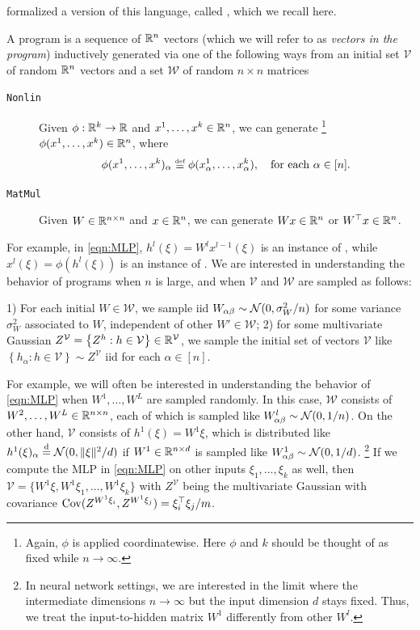 \documentclass[main.tex]{subfiles}
\begin{document}
\citet{yangTP2} formalized a version of this language, called \netsort{}, which we recall here.   
\begin{defn}\label{defn:netsort}
A \netsort{} program is a sequence of $\mathbb{R}^{n}$ vectors (which we will refer to as \emph{vectors in the program}) inductively generated via one of the following ways from an initial set $\mathcal{V}$ of random $\mathbb{R}^{n}$ vectors and a set $\mathcal{W}$ of random $n\times n$ matrices 
\begin{description}
\item [\texttt{Nonlin\label{instr:nonlin}}] Given $\phi:\mathbb{R}^{k}\to\mathbb{R}$ and $x^{1},\ldots,x^{k}\in\mathbb{R}^{n}$, we can generate%
\footnote{Again, $\phi$ is applied coordinatewise.
Here $\phi$ and $k$ should be thought of as fixed while $n \to \infty$.}
$\phi(x^{1},\ldots,x^{k})\in\mathbb{R}^{n}$, where
\[\phi(x^{1},\ldots,x^{k})_\alpha \defeq\phi(x^{1}_\alpha,\ldots,x^{k}_\alpha),\quad\text{for each $\alpha \in [n]$.}\] 
\item [\texttt{MatMul\label{instr:matmul}}] Given $W\in\mathbb{R}^{n\times n}$ and $x\in\mathbb{R}^{n}$, we can generate $Wx\in\mathbb{R}^{n}$ or $W^{\top}x\in\mathbb{R}^{n}$.
\end{description}
\end{defn}
For example, in \cref{eqn:MLP}, $h^{l}(\xi)=W^{l}x^{l-1}(\xi)$ is an instance of , while $x^{l}(\xi)=\phi(h^{l}(\xi))$ is an instance of .
We are interested in understanding the behavior of \netsort{} programs when $n$ is large, and when $\mathcal{V}$ and $\mathcal{W}$ are sampled as follows:
\begin{setup}[\netsort{}]\label{setup:netsort}
1) For each initial $W\in\mathcal{W}$, we sample iid $W_{\alpha\beta}\sim\mathcal{N}(0,\sigma_{W}^{2}/n)$ for some variance $\sigma_{W}^{2}$ associated to $W$, independent of other $W' \in \mathcal {W}$; 2) for some multivariate Gaussian $Z^{\mathcal{V}}=\left\{ Z^{h}:h\in\mathcal{V}\right\} \in\mathbb{R}^{\mathcal{V}}$, we sample the initial set of vectors $\mathcal{V}$ like $\left\{ h_{\alpha}:h\in\mathcal{V}\right\} \sim Z^{\mathcal{V}}$ iid for each $\alpha\in[n]$.
\end{setup}
\begin{exmp}\label{exmp:MLPsetup}
For example, we will often be interested in understanding the behavior of \cref{eqn:MLP} when $W^1,\ldots, W^L$ are sampled randomly.
In this case, $\mathcal W$ consists of $W^2, \ldots, W^L \in \mathbb{R}^{n\times n}$, each of which is sampled like $W^l_{\alpha\beta}\sim\mathcal{N}(0, 1/n)$.
On the other hand, $\mathcal V$ consists of $h^1(\xi)=W^1 \xi$, which is distributed like $h^1(\xi)_\alpha \overset{\mathrm{d}}{=} \mathcal{N}(0, \|\xi\|^2/d)$ if $W^1 \in \mathbb{R}^{n\times d}$ is sampled like $W^1_{\alpha\beta} \sim \mathcal{N}(0,1/d)$.%
\footnote{In neural network settings, we are interested in the limit where the intermediate dimensions $n\to\infty$ but the input dimension $d$ stays fixed.
Thus, we treat the input-to-hidden matrix $W^1$ differently from other $W^l$.}
If we compute the MLP in \cref{eqn:MLP} on other inputs $\xi_1, \ldots, \xi_k$ as well, then $\mathcal V = \{W^1 \xi, W^1 \xi_1, \ldots, W^1 \xi_k\}$ with $Z^{\mathcal V}$ being the multivariate Gaussian with covariance $\operatorname{Cov}(Z^{W^1 \xi_i}, Z^{W^1 \xi_j}) = \xi_i^\top \xi_j / m$.
\end{exmp}
\end{document}
